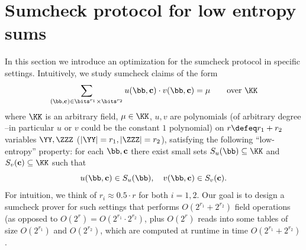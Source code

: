 \section{Sumcheck protocol for low entropy sums}

\newcommand{\sumcheckpolone}{U}
\newcommand{\sumcheckpoltwo}{V}
\renewcommand{\cc}{\mathbf{c}}

In this section we introduce an optimization for the sumcheck protocol in specific settings. Intuitively, we study sumcheck claims of the form
%
$$
\sum_{(\bb,\cc)\in \bits^{r_1} \times \bits^{r_2}} u(\bb,\cc) \cdot v(\bb,\cc) =\mu \qquad \text{over } \KK
$$
where $\KK$ is an arbitrary field,  $\mu\in \KK$, $u,v$ are polynomials (of arbitrary degree --in particular $u$ or $v$ could be the constant $1$ polynomial) on $r\defeq r_1 + r_2$ variables $\YY, \ZZZ$ ($|\YY|=r_1, |\ZZZ|=r_2$), satisfying the following ``low-entropy'' property: for each $\bb,\cc$ there exist small sets $S_u(\bb)\subseteq \KK$ and $S_v(\cc)\subseteq \KK$ such that
$$u(\bb,\cc)\in S_u(\bb), \quad v(\bb,\cc)\in S_v(\cc).$$
%
For intuition, we think of $r_i \approx 0.5\cdot r$ for both $i=1,2$. Our goal is to design a sumcheck prover for such settings that performs $O(2^{r_1} + 2^{r_2})$ field operations (as opposed to  $O(2^{r})=O(2^{r_1}\cdot 2^{r_2})$, plus $O(2^r)$ reads into some tables of size $O(2^{r_1})$ and $O(2^{r_2})$, which are computed at runtime in time $O(2^{r_1} + 2^{r_2})$.




\begin{example}
\end{example}

